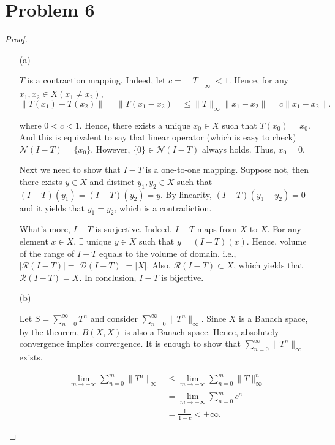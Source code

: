 \documentclass[12pt]{article}
\begin{document}
\section*{Problem 6}

\begin{proof}

\begin{enumerate}

\item [(a)]

$T$ is a contraction mapping. Indeed, let $ c = \|T\|_\infty < 1$. Hence, for any $x_1, x_2 \in X (x_1 \neq x_2)$, 
$$
\|T(x_1) - T(x_2)\| = \|T(x_1 - x_2)\| \leqslant \|T\|_\infty\|x_1 - x_2\| = c\|x_1 - x_2\|.
$$

where $0<c<1$. Hence, there exists a unique $x_0\in X$ such that $T(x_0) = x_0$. And this is equivalent to say that linear operator (which is easy to check) $ \mathcal N (I-T) = \{x_0\}$. However, $\{0\}\in \mathcal N (I-T)$ always holds. Thus, $x_0 = 0$. 

Next we need to show that $I-T$ is a one-to-one mapping. Suppose not, then there exists $y\in X$ and distinct $y_1, y_2 \in X$ such that $(I-T)(y_1) = (I-T)(y_2) = y $. By linearity, $(I-T)(y_1 - y_2) = 0$ and it yields that $y_1 = y_2$, which is a contradiction. 

What's more, $I-T$ is surjective. Indeed, $I - T$ maps from $X$ to $X$. For any element $x\in X$, $\exists$ unique $y\in X$ such that $y = (I-T)(x)$. Hence, volume of the range of $I-T$ equals to the volume of domain. i.e., $|\mathcal R(I-T)| = |\mathcal D(I-T)| = |X|$. Also, $\mathcal R(I-T) \subset X$, which yields that $\mathcal R(I-T) = X$. In conclusion, $I-T$ is bijective. 

\item [(b)]

Let $S = \sum_{n=0}^\infty T^n$ and consider $\sum_{n=0}^\infty\|T^n\|_\infty$. Since $X$ is a Banach space, by the theorem, $B(X, X)$ is also a Banach space. Hence, absolutely convergence implies convergence. It is enough to show that $\sum_{n=0}^\infty\|T^n\|_\infty$ exists.

$$
\begin{aligned}
\lim_{m\rightarrow +\infty}\sum_{n=0}^m \|T^n\|_\infty & \leqslant \lim_{m\rightarrow +\infty}\sum_{n=0}^m\|T\|^n_\infty \\
& = \lim_{m\rightarrow +\infty}\sum_{n=0}^m c^n \\
& = \frac{1}{1-c} < +\infty.
\end{aligned}
$$


\end{enumerate}
\end{proof}
\end{document}
